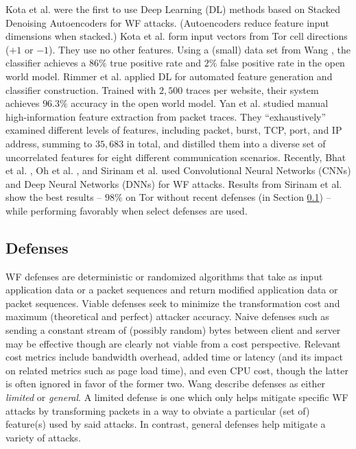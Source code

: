 \documentclass[runningheads]{llncs}
\begin{document}
Kota et al. \cite{abe2016fingerprinting} were the first to use Deep Learning (DL) methods based on Stacked 
Denoising Autoencoders for WF attacks. (Autoencoders reduce feature input dimensions when stacked.)
Kota et al. form input vectors from Tor cell directions ($+1$ or $-1$). They use no other features.
Using a (small) data set from Wang \cite{wang2016website}, the classifier achieves a $86\%$ true positive 
rate and $2\%$ false positive rate in the open world model. Rimmer et al. \cite{rimmer2018automated}
applied DL for automated feature generation and classifier construction. Trained with $2,500$ traces
per website, their system achieves $96.3\%$ accuracy in the open world model. Yan et al. \cite{yan2018feature}
studied manual high-information feature extraction from packet traces. They ``exhaustively'' examined different 
levels of features, including packet, burst, TCP, port, and IP address, summing to $35,683$ in total, and 
distilled them into a diverse set of uncorrelated features for eight different communication scenarios. 
Recently, Bhat et al. \cite{bhat2018var}, Oh et al. \cite{oh2017pfp}, and Sirinam et al. \cite{sirinam2018deep}
used Convolutional Neural Networks (CNNs) and Deep Neural Networks (DNNs) for WF attacks. Results from
Sirinam et al. show the best results -- $98\%$ on Tor without recent defenses (in Section \ref{sec:defenses}) -- 
while performing favorably when select defenses are used.

\subsection{Defenses} \label{sec:defenses}
WF defenses are deterministic or randomized algorithms that take as input application data or a packet sequences
and return modified application data or packet sequences. Viable defenses seek to minimize the transformation
cost and maximum (theoretical and perfect) attacker accuracy. Naive defenses such as sending a constant stream
of (possibly random) bytes between client and server may be effective though are clearly not viable from a cost
perspective. Relevant cost metrics include bandwidth overhead, added time or latency (and its impact on related
metrics such as page load time), and even CPU cost, though the latter is often ignored in favor of the former two.
Wang \cite{wang2016website} describe defenses as either \emph{limited} or \emph{general}. A limited defense is
one which only helps mitigate specific WF attacks by transforming packets in a way to obviate a particular 
(set of) feature(s) used by said attacks. In contrast, general defenses help mitigate a variety of attacks.
\end{document}
